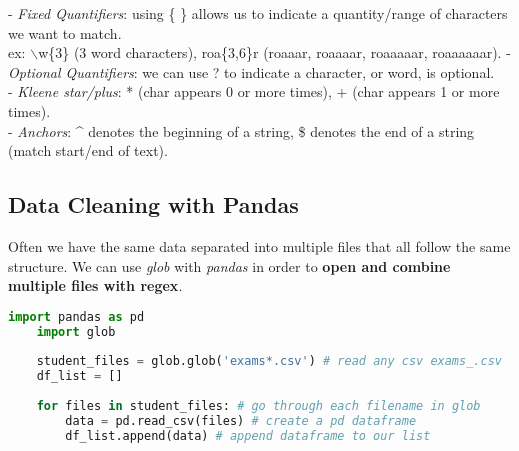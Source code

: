 \documentclass[11pt, a4paper]{article}
\begin{document}
\begin{spacing}{1.1}
	\hspace*{3mm} - \textit{Fixed Quantifiers}: using \{ \} allows us to indicate a quantity/range of characters we want to match. \\
	\hspace*{38mm} ex: $\backslash$w\{3\} (3 word characters), roa\{3,6\}r (roaaar, roaaaar, roaaaaar, roaaaaaar).\newpage
	\noindent \hspace*{3mm} - \textit{Optional Quantifiers}: we can use ? to indicate a character, or word, is optional. \\
	\hspace*{3mm} - \textit{Kleene star/plus}: * (char appears 0 or more times), + (char appears 1 or more times). \\
	\hspace*{3mm} - \textit{Anchors}: \^{} denotes the beginning of a string, \$ denotes the end of a string (match start/end of text). \\	
	\subsection{Data Cleaning with Pandas}
	Often we have the same data separated into multiple files that all follow the same structure. We can use \textit{glob} with \textit{pandas} in order to \textbf{open and combine multiple files with regex}. 
	\begin{lstlisting}[language=Python]
	import pandas as pd
	import glob
	
	student_files = glob.glob('exams*.csv') # read any csv exams_.csv
	df_list = [] 
	
	for files in student_files: # go through each filename in glob 
		data = pd.read_csv(files) # create a pd dataframe
		df_list.append(data) # append dataframe to our list
	

\end{lstlisting}
\end{spacing}
\end{document}
